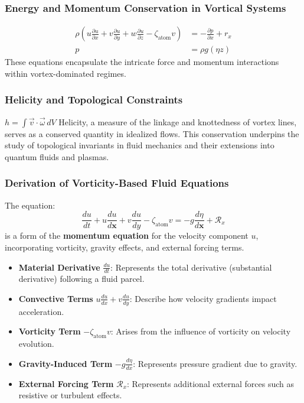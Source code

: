     \subsubsection*{Energy and Momentum Conservation in Vortical Systems}
    \begin{align}
        \rho \left( u \frac{\partial u}{\partial x} + v \frac{\partial u}{\partial y} + w \frac{\partial u}{\partial z} - \zeta_\text{atom} v \right) &= -\frac{\partial p}{\partial x} + r_x \\
        p &= \rho g(\eta z)
    \end{align}
    These equations encapsulate the intricate force and momentum interactions within vortex-dominated regimes.


\subsubsection*{Helicity and Topological Constraints}
$h = \int \vec{v} \cdot \vec{\omega} \, dV$
 Helicity, a measure of the linkage and knottedness of vortex lines, serves as a conserved quantity in idealized flows. This conservation underpins the study of topological invariants in fluid mechanics and their extensions into quantum fluids and plasmas.


    \subsubsection*{Derivation of Vorticity-Based Fluid Equations}
    The equation:
    \begin{equation*}
        \frac{d u}{d t}+u \frac{d u}{d \boldsymbol{x}}+v \frac{d u}{d y}-\zeta_{\text {atom}} v=-g \frac{d \eta}{d \boldsymbol{x}}+\mathcal{R}_x
    \end{equation*}
    is a form of the \textbf{momentum equation} for the velocity component $u$, incorporating vorticity, gravity effects, and external forcing terms.

    \begin{itemize}
        \item \textbf{Material Derivative} $\frac{d u}{d t}$: Represents the total derivative (substantial derivative) following a fluid parcel.
        \item \textbf{Convective Terms} $u \frac{d u}{dx} + v \frac{d u}{dy}$: Describe how velocity gradients impact acceleration.
        \item \textbf{Vorticity Term} $-\zeta_\text{atom} v$: Arises from the influence of vorticity on velocity evolution.
        \item \textbf{Gravity-Induced Term} $-g \frac{d \eta}{d x}$: Represents pressure gradient due to gravity.
        \item \textbf{External Forcing Term} $\mathcal{R}_x$: Represents additional external forces such as resistive or turbulent effects.
    \end{itemize}

